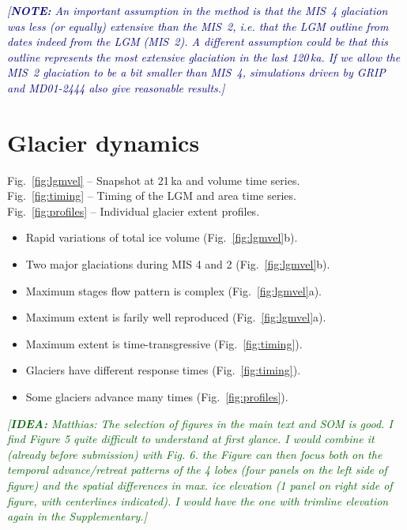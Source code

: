 \documentclass{article}
\newcommand{\idea}[1]{\textcolor{darkgreen}{\emph{[\textbf{IDEA:} #1]}}}
\newcommand{\note}[1]{\textcolor{darkblue}{\emph{[\textbf{NOTE:} #1]}}}
\begin{document}
    \note{An important assumption in the method is that the MIS~4 glaciation
          was less (or equally) extensive than the MIS~2, i.e. that the LGM
          outline from \citet{Ehlers.etal.2011} dates indeed from the LGM
          (MIS~2). A different assumption could be that this outline represents
          the most extensive glaciation in the last 120\,ka. If we allow the
          MIS~2 glaciation to be a bit smaller than MIS~4, simulations driven
          by GRIP and MD01-2444 also give reasonable results.}


\section{Glacier dynamics}

    Fig.~\ref{fig:lgmvel} -- Snapshot at 21\,ka and volume time series.\\
    Fig.~\ref{fig:timing} -- Timing of the LGM and area time series.\\
    Fig.~\ref{fig:profiles} -- Individual glacier extent profiles.

    \begin{itemize}
    \item Rapid variations of total ice volume (Fig.~\ref{fig:lgmvel}b).
    \item Two major glaciations during MIS 4 and 2 (Fig.~\ref{fig:lgmvel}b).
    \item Maximum stages flow pattern is complex (Fig.~\ref{fig:lgmvel}a).
    \item Maximum extent is farily well reproduced (Fig.~\ref{fig:lgmvel}a).
    \item Maximum extent is time-transgressive (Fig.~\ref{fig:timing}).
    \item Glaciers have different response times (Fig.~\ref{fig:timing}).
    \item Some glaciers advance many times (Fig.~\ref{fig:profiles}).
    \end{itemize}

    \idea{Matthias: The selection of figures in the main text and SOM is good.
          I find Figure 5 quite difficult to understand at first glance. I
          would combine it (already before submission) with Fig. 6. the Figure
          can then focus both on the temporal advance/retreat patterns of the 4
          lobes (four panels on the left side of figure) and the spatial
          differences in max. ice elevation (1 panel on right side of figure,
          with centerlines indicated). I would have the one with trimline
          elevation again in the Supplementary.}
\end{document}

